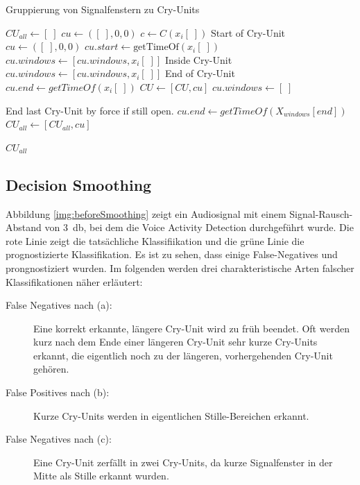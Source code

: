 \begin{algorithm}[h]
	\caption{Gruppierung von Signalfenstern zu Cry-Units}
	\label{alg:cryUnit}
	\begin{algorithmic}[1]
		\State $ CU_{all} \gets [\;]$
		\State $ cu\gets ([\;],0,0)$
				\State $ c \gets C(x_i[\;])$
				\State \Comment Start of Cry-Unit
						\State $cu\gets ([\;],0,0)$
						\State $cu.start \gets \text{getTimeOf}(x_i[\;])$
						\State $cu.windows \gets [cu.windows, x_i[\;]]$
				\EndIf
				\State \Comment Inside Cry-Unit
						\State $cu.windows \gets [cu.windows, x_i[\;]]$
				\EndIf
				\State \Comment End of Cry-Unit
						\State $cu.end \gets  getTimeOf(x_i[\;])$
						\State $CU \gets [CU, cu]$
						\State $cu.windows \gets [\;]$
				\EndIf
		\EndFor
		
		\State \Comment End last Cry-Unit by force if still open.
		\State $cu.end \gets  getTimeOf(X_{windows}[end])$
		\State $CU_{all} \gets [CU_{all}, cu]$
		\EndIf
		
		\Return $CU_{all}$
		
		\EndFunction
		
	\end{algorithmic}
\end{algorithm}

\subsection{Decision Smoothing}

Abbildung \ref{img:beforeSmoothing} zeigt ein Audiosignal mit einem Signal-Rausch-Abstand von \SI{3}{\decibel}, bei dem die Voice Activity Detection durchgeführt wurde. Die rote Linie zeigt die tatsächliche Klassifiikation und die grüne Linie die prognostizierte Klassifikation. Es ist zu sehen, dass einige False-Negatives und prongnostiziert wurden. Im folgenden werden drei charakteristische Arten falscher Klassifikationen näher erläutert:

\begin{description}
	\item [False Negatives nach (a): ] Eine korrekt erkannte, längere Cry-Unit wird zu früh beendet. Oft werden kurz nach dem Ende einer längeren Cry-Unit sehr kurze Cry-Units erkannt, die eigentlich noch zu der längeren, vorhergehenden Cry-Unit gehören.
	\item [False Positives nach (b): ] Kurze Cry-Units werden in eigentlichen Stille-Bereichen erkannt.
	\item [False Negatives nach (c): ] Eine Cry-Unit zerfällt in zwei Cry-Units, da kurze Signalfenster in der Mitte als Stille erkannt wurden.
\end{description}


